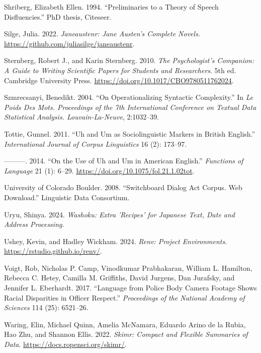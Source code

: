\documentclass[
  letterpaper,
]{latex/krantz}
\newlength{\cslhangindent}
\newenvironment{CSLReferences}[2] %
 {\begin{list}{}{%
  \setlength{\itemindent}{0pt}
  \setlength{\leftmargin}{0pt}
  \setlength{\parsep}{0pt}
  \ifodd #1
   \setlength{\leftmargin}{\cslhangindent}
   \setlength{\itemindent}{-1\cslhangindent}
  \fi
  \setlength{\itemsep}{#2\baselineskip}}}
 {\end{list}}
\theoremstyle{definition}
\theoremstyle{remark}
\begin{document}
\begin{CSLReferences}{1}{0}
Shriberg, Elizabeth Ellen. 1994. {``Preliminaries to a Theory of Speech
Disfluencies.''} PhD thesis, Citeseer.

Silge, Julia. 2022. \emph{Janeaustenr: Jane Austen's Complete Novels}.
\url{https://github.com/juliasilge/janeaustenr}.

Sternberg, Robert J., and Karin Sternberg. 2010. \emph{The
Psychologist's Companion: A Guide to Writing Scientific Papers for
Students and Researchers}. 5th ed. Cambridge University Press.
\url{https://doi.org/10.1017/CBO9780511762024}.

Szmrecsanyi, Benedikt. 2004. {``On Operationalizing Syntactic
Complexity.''} In \emph{Le Poids Des Mots. Proceedings of the 7th
International Conference on Textual Data Statistical Analysis.
Louvain-La-Neuve}, 2:1032--39.

Tottie, Gunnel. 2011. {``Uh and Um as Sociolinguistic Markers in British
English.''} \emph{International Journal of Corpus Linguistics} 16 (2):
173--97.

---------. 2014. {``On the Use of Uh and Um in American English.''}
\emph{Functions of Language} 21 (1): 6--29.
\url{https://doi.org/10.1075/fol.21.1.02tot}.

University of Colorado Boulder. 2008. {``Switchboard Dialog Act Corpus.
Web Download.''} Linguistic Data Consortium.

Uryu, Shinya. 2024. \emph{Washoku: Extra 'Recipes' for Japanese Text,
Date and Address Processing}.

Ushey, Kevin, and Hadley Wickham. 2024. \emph{Renv: Project
Environments}. \url{https://rstudio.github.io/renv/}.

Voigt, Rob, Nicholas P. Camp, Vinodkumar Prabhakaran, William L.
Hamilton, Rebecca C. Hetey, Camilla M. Griffiths, David Jurgens, Dan
Jurafsky, and Jennifer L. Eberhardt. 2017. {``Language from Police Body
Camera Footage Shows Racial Disparities in Officer Respect.''}
\emph{Proceedings of the National Academy of Sciences} 114 (25):
6521--26.

Waring, Elin, Michael Quinn, Amelia McNamara, Eduardo Arino de la Rubia,
Hao Zhu, and Shannon Ellis. 2022. \emph{Skimr: Compact and Flexible
Summaries of Data}. \url{https://docs.ropensci.org/skimr/}.


\end{CSLReferences}
\end{document}
